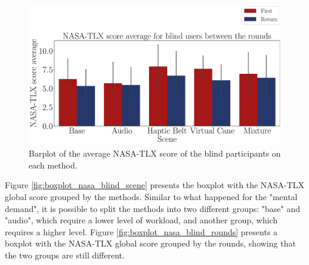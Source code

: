 \begin{figure}[!htb]
    \centering
    \includegraphics[width = \textwidth]{Resultados/Nasa/Figuras/pdf/barplot_nasa_avg_5_scene_blind.pdf}
    \caption{Barplot of the average NASA-TLX score of the blind participants on each method.}
    \label{fig:barplot_nasa_avg_5_scene_blind}
\end{figure}

Figure \ref{fig:boxplot_nasa_blind_scene} presents the boxplot with the NASA-TLX global score grouped by the methods. Similar to what happened for the "mental demand", it is possible to split the methods into two different groups: "base" and "audio", which require a lower level of workload, and another group, which requires a higher level. Figure \ref{fig:boxplot_nasa_blind_rounds} presents a boxplot with the NASA-TLX global score grouped by the rounds, showing that the two groups are still different. 

